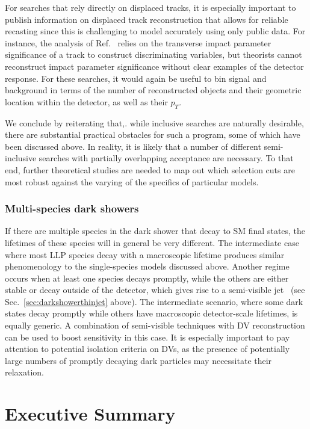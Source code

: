For searches that rely directly on displaced tracks, it is especially important to publish information on displaced track reconstruction that allows for reliable recasting since this is challenging to model accurately using only public data.   For instance, the analysis of Ref.~\cite{Sirunyan:2018njd} relies on the transverse impact parameter significance of a track to construct discriminating variables, but theorists cannot reconstruct impact parameter significance without clear examples of the detector response. For these searches, it would again be useful to bin signal and background in terms of the number of reconstructed objects and their geometric location within the detector, as well as their $p_T$. 

We conclude by reiterating that,. while inclusive searches are naturally desirable, there are substantial practical obstacles for such a program, some of which have been discussed above. In reality, it is likely that a number of different semi-inclusive searches with partially overlapping acceptance are necessary. To that end, further theoretical studies are needed to map out which selection cuts are most robust against the varying of the specifics of particular models.

\subsubsection{Multi-species dark showers}
\label{sec:darkshowersemivisible}

If there are multiple species in the dark shower that decay to SM final states, the lifetimes of these species will in general be very different. The intermediate case where most LLP species decay with a macroscopic lifetime produces similar phenomenology to the single-species models discussed above. Another regime occurs when at least one species decays promptly, while the others are either stable or decay outside of the detector, which gives rise to a semi-visible jet~\cite{Cohen:2015toa} (see Sec.~\ref{sec:darkshowerthinjet} above). The intermediate scenario, where some dark states decay promptly while others have macroscopic detector-scale lifetimes, is equally generic. A combination of semi-visible techniques with DV reconstruction can be used to boost sensitivity in this case.  It is especially important  to pay attention to potential isolation criteria on DVs, as the presence of potentially large numbers of promptly decaying dark particles may necessitate their relaxation.

\section{Executive Summary}
\label{sec:darkshowersummary}


